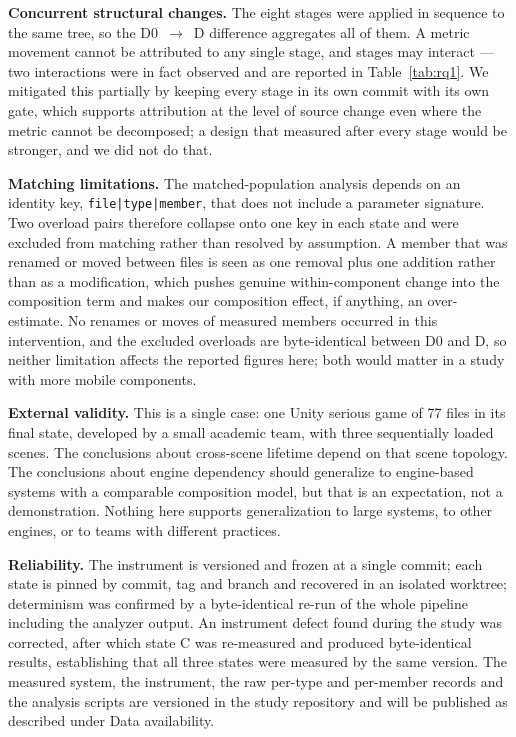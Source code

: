 \documentclass{sbc2019}%
\begin{document}
\medskip\noindent\textbf{Concurrent structural changes.} The eight stages
were applied in sequence to the same tree, so the D0~$\rightarrow$~D difference
aggregates all of them. A metric movement cannot be attributed to any single
stage, and stages may interact --- two interactions were in fact observed and are
reported in Table~\ref{tab:rq1}. We mitigated this partially by keeping every
stage in its own commit with its own gate, which supports attribution at the
level of source change even where the metric cannot be decomposed; a design that
measured after every stage would be stronger, and we did not do that.

\medskip\noindent\textbf{Matching limitations.} The matched-population
analysis depends on an identity key, \texttt{file|type|member}, that does not
include a parameter signature. Two overload pairs therefore collapse onto one
key in each state and were excluded from matching rather than resolved by
assumption. A member that was renamed or moved between files is seen as one
removal plus one addition rather than as a modification, which pushes genuine
within-component change into the composition term and makes our composition
effect, if anything, an over-estimate. No renames or moves of measured members
occurred in this intervention, and the excluded overloads are byte-identical
between D0 and D, so neither limitation affects the reported figures here; both
would matter in a study with more mobile components.

\medskip\noindent\textbf{External validity.} This is a single case: one
Unity serious game of 77 files in its final state, developed by a small academic
team, with three sequentially loaded scenes. The conclusions about cross-scene
lifetime depend on that scene topology. The conclusions about engine dependency
should generalize to engine-based systems with a comparable composition model,
but that is an expectation, not a demonstration. Nothing here supports
generalization to large systems, to other engines, or to teams with different
practices.

\medskip\noindent\textbf{Reliability.} The instrument is versioned and frozen at
a single commit; each state is pinned by commit, tag and branch and recovered in
an isolated worktree; determinism was confirmed by a byte-identical re-run of the
whole pipeline including the analyzer output. An instrument defect found during
the study was corrected, after which state C was re-measured and produced
byte-identical results, establishing that all three states were measured by the
same version. The measured system, the instrument, the raw per-type and
per-member records and the analysis scripts are versioned in the study
repository and will be published as described under Data availability.
\end{document}
